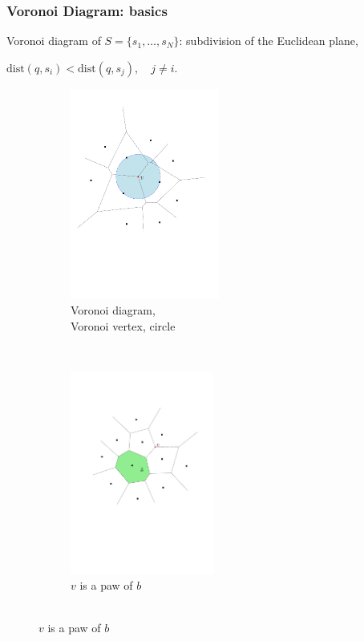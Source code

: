 \def\paw{paw } \def\paws{paws } \def\Ot{\tilde O}

\begin{frame} \frametitle{Voronoi Diagram: basics} \vspace{-3mm}

\begin{block}{\vspace*{-3ex}}
Voronoi diagram of $S = \{ s_1, \ldots, s_N \}$:
     subdivision of the Euclidean plane,\\ \medskip
\centerline{$\mathrm{dist} (q, s_i) < \mathrm{dist} (q, s_j),\quad j\ne i$.}
\end{block}

\begin{figure}[h] \centering
\begin{subfigure}[b]{0.46\textwidth} \centering
	\includegraphics[width=4.9cm]{figs/voronoiCircle}
	\caption{Voronoi diagram, \\
		Voronoi vertex, circle}
	\label{fig:voronoiCircle}
\end{subfigure} ~~
\begin{subfigure}[b]{0.44\textwidth} \centering
	\includegraphics[width=4.7cm]{figs/neighbor.pdf}
	\caption{$v$ is a \paw of $b$ \\ \ }
	\label{fig:Paw}
\end{subfigure}
\end{figure} \end{frame}

